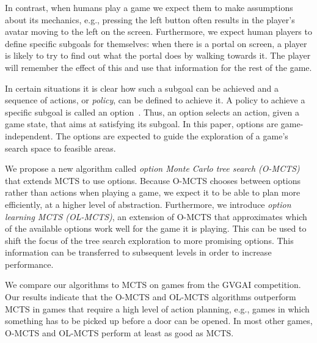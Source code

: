 In contrast, when humans play a game we expect them to make assumptions about
its mechanics, e.g., pressing the left button often results in the player's
avatar moving to the left on the screen.  Furthermore, we expect human players
to define specific subgoals for themselves: when there is a portal on screen, a
player is likely to try to find out what the portal does by walking towards it.
The player will remember the effect of this and use that information for the
rest of the game.

In certain situations it is clear how such a subgoal can be achieved and a
sequence of actions, or \emph{policy}, can be defined to achieve it. A policy to
achieve a specific subgoal is called an option~\cite{sutton1999between}. Thus,
an option selects an action, given a game state, that aims at satisfying its
subgoal. In this paper, options are game-independent. The options are expected
to guide the exploration of a game's search space to feasible areas.


We propose a new algorithm called \emph{option Monte Carlo tree search (O-MCTS)}
that extends MCTS to use options. Because O-MCTS chooses between options rather
than actions when playing a game, we expect it to be able to plan more
efficiently, at a higher level of abstraction. Furthermore, we introduce
\emph{option learning MCTS (OL-MCTS)}, an extension of O-MCTS that approximates
which of the available options work well for the game it is playing. This
can be used to shift the focus of the tree search exploration to more promising
options. This information can be transferred to subsequent levels in order to
increase performance.

We compare our algorithms to MCTS on games from the GVGAI competition. Our
results indicate that the O-MCTS and OL-MCTS algorithms outperform MCTS in games
that require a high level of action planning, e.g., games in which something has
to be picked up before a door can be opened. In most other games, O-MCTS and
OL-MCTS perform at least as good as MCTS\@.
